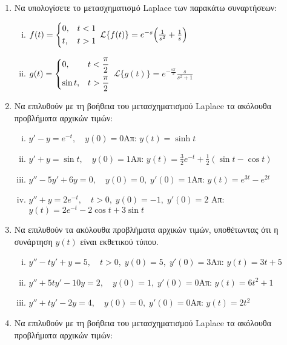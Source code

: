 \begin{enumerate}
  \item Να υπολογίσετε το μετασχηματισμό Laplace των παρακάτω συναρτήσεων:
    \begin{enumerate}[i)]
      \item $f(t)=\begin{dcases} 0, & t<1 \\ t, & t>1 \end{dcases}$ \hfill 
        $\mathcal{L}\{f(t)\}=e^{-s}\Bigl(\frac{1}{s^2}+\frac{1}{s}\Bigr)$
      \item $g(t)=\begin{dcases} 0, & t<\frac{\pi}{2} \\ \sin t, & t>\frac{\pi}{2} 
        \end{dcases}$ \hfill $\mathcal{L}\{g(t)\}=e^{-\frac{s\pi}{2}}\frac{s}{s^2+1}$
      \end{enumerate}

    \item Να επιλυθούν με τη βοήθεια του μετασχηματισμού Laplace τα ακόλουθα προβλήματα 
      αρχικών τιμών:
      \begin{enumerate}[i)]
        \item $y'-y=e^{-t},\quad y(0)=0$\hfill Απ: $y(t)=\sinh t$
        \item $y'+y=\sin t,\quad y(0)=1$\hfill Απ: $y(t)=\frac{3}{2}e^{-t}+
          \frac{1}{2}(\sin t-\cos t)$
        \item $y''-5y'+6y=0,\quad y(0)=0, \; y'(0)=1$\hfill Απ: $y(t)=e^{3t}-e^{2t}$
        \item $y''+y=2e^{-t},\quad t>0,\; y(0)=-1,\; y'(0)=2$
          \hfill Απ: $y(t)=2e^{-t}-2\cos t+3 \sin t$
      \end{enumerate}

    \item\label{it:ekth} Να επιλυθούν τα ακόλουθα προβλήματα αρχικών τιμών, υποθέτωντας 
      ότι η συνάρτηση $ y(t) $ είναι εκθετικού τύπου.
      \begin{enumerate}[i)]
        \item $y''-ty'+y=5, \quad t>0,\; y(0)=5,\; y'(0)=3$\hfill Απ: $y(t)=3t+5$
        \item $y'' +5ty'-10y=2, \quad y(0)=1,\; y'(0)=0$\hfill Απ: $y(t)=6t^2+1$
        \item $y'' +ty'-2y=4, \quad y(0)=0,\; y'(0)=0$\hfill Απ: $y(t)=2t^2$
      \end{enumerate}

    \item Να επιλυθούν με τη βοήθεια του μετασχηματισμού Laplace τα ακόλουθα προβλήματα 
      αρχικών τιμών:


\end{enumerate}
